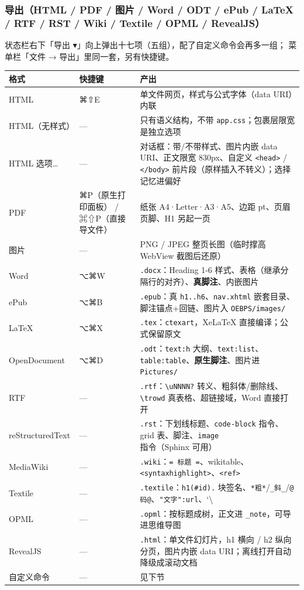\documentclass[11pt,a4paper]{ctexart}
\begin{document}
\subsubsection{导出（HTML / PDF / 图片 / Word / ODT / ePub / LaTeX / RTF / RST / Wiki / Textile / OPML / RevealJS）}

状态栏右下「导出 ▾」向上弹出十七项（五组），配了自定义命令会再多一组；
菜单栏「文件 → 导出」里同一套，另有快捷键。

\begin{center}
\begin{tabular}{lll}
\hline
\textbf{格式} & \textbf{快捷键} & \textbf{产出} \\
\hline
HTML & ⌘⇧E & 单文件网页，样式与公式字体（data URI）内联 \\
HTML（无样式） & — & 只有语义结构，不带 \texttt{app.css}；包裹层限宽是独立选项 \\
HTML 选项… & — & 对话框：带/不带样式、图片内嵌 data URI、正文限宽 830px、自定义 \texttt{\textless{}head\textgreater{}} / \texttt{\textless{}/body\textgreater{}} 前片段（原样插入不转义）；选择记忆进偏好 \\
PDF & ⌘P（原生打印面板） / ⌘⇧P（直接导文件） & 纸张 A4·Letter·A3·A5、边距 pt、页眉页脚、H1 另起一页 \\
图片 & — & PNG / JPEG 整页长图（临时撑高 WebView 截图后还原） \\
Word & ⌥⌘W & \texttt{.docx}：Heading 1-6 样式、表格（继承分隔行的对齐）、\textbf{真脚注}、内嵌图片 \\
ePub & ⌥⌘B & \texttt{.epub}：真 \texttt{h1..h6}、\texttt{nav.xhtml} 嵌套目录、脚注锚点+回链、图片入 \texttt{OEBPS/images/} \\
LaTeX & ⌥⌘X & \texttt{.tex}：\texttt{ctexart}，XeLaTeX 直接编译；公式保留原文 \\
OpenDocument & ⌥⌘D & \texttt{.odt}：\texttt{text:h} 大纲、\texttt{text:list}、\texttt{table:table}、\textbf{原生脚注}、图片进 \texttt{Pictures/} \\
RTF & — & \texttt{.rtf}：\texttt{\textbackslash{}uNNNN?} 转义、粗斜体/删除线、\texttt{\textbackslash{}trowd} 真表格、超链接域，Word 直接打开 \\
reStructuredText & — & \texttt{.rst}：下划线标题、\texttt{code-block} 指令、grid 表、脚注、\texttt{image} 指令（Sphinx 可用） \\
MediaWiki & — & \texttt{.wiki}：\texttt{= 标题 =}、wikitable、\texttt{\textless{}syntaxhighlight\textgreater{}}、\texttt{\textless{}ref\textgreater{}} \\
Textile & — & \texttt{.textile}：\texttt{h1(\#id).} 块签名、\texttt{*粗*}/\texttt{\_斜\_}/\texttt{@码@}、\texttt{"文字":url}、`\textbackslash{} \\
OPML & — & \texttt{.opml}：按标题成树，正文进 \texttt{\_note}，可导进思维导图 \\
RevealJS & — & \texttt{.html}：单文件幻灯片，h1 横向 / h2 纵向分页，图片内嵌 data URI；离线打开自动降级成滚动文档 \\
自定义命令 & — & 见下节 \\
\hline
\end{tabular}
\end{center}
\end{document}
